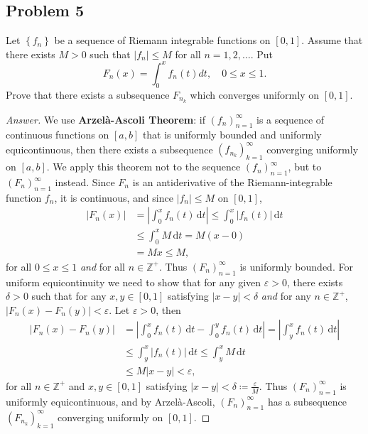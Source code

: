 \documentclass[12pt]{article}
\newcommand{\z}{\mathbb{Z}}
\newcommand{\ita}[1]{\textit{#1}}
\newcommand\paren[1]{\left( #1 \right)}
\newcommand\setb[1]{\left \{ #1 \right \}}
\newcommand{\abs}[1]{\left | #1 \right |}
\newcommand{\eps}{\varepsilon}
\renewcommand{\i}[4]{\int_{#1}^{#2} {#3} \, \mathrm{d} {#4} }
\theoremstyle{definition}
\begin{document}
\subsection{Problem 5 \texorpdfstring{\cite{Rudin}}{}}
Let $\setb{ f_n }$ be a sequence of Riemann integrable functions on $[0,1]$. Assume that there exists $M > 0$ such that $|f_n| \leq M$ for all $n = 1 , 2 , \dotsc$. Put
\[
    F_n(x) = \int_0^x f_n(t) dt, \quad 0 \leq x \leq 1.
\]
Prove that there exists a subsequence $F_{n_k}$ which converges uniformly on $[0,1]$.
\begin{proof}[Answer]
    We use \textbf{Arzel\`a-Ascoli Theorem}: if $\paren{ f_n }_{n = 1}^{\infty}$ is a sequence of continuous functions on $[a,b]$ that is uniformly bounded and uniformly equicontinuous, then there exists a subsequence $\paren{ f_{n_k} }_{k = 1}^{\infty}$ converging uniformly on $[a,b]$. We apply this theorem not to the sequence $\paren{ f_n }_{n=1}^{\infty}$, but to $\paren{ F_n }_{n = 1}^{\infty}$ instead. Since $F_n$ is an antiderivative of the Riemann-integrable function $f_n$, it is continuous, and since $\abs{ f_n } \leq M$ on $[0,1]$, 
    \begin{align*}
        \abs{ F_n(x) } & = \abs{ \i{0}{x}{f_n(t)}{t} } \leq \i{0}{x}{ \abs{ f_n(t) } }{t} \\ 
        & \leq \i{0}{x}{M}{t} = M(x - 0) \\ 
        & = Mx \leq M ,
    \end{align*}
    for all $0 \leq x \leq 1$ \ita{and} for all $n \in \z^+$. Thus $\paren{ F_n }_{n = 1}^{\infty}$ is uniformly bounded. For uniform equicontinuity we need to show that for any given $\eps > 0$, there exists $\delta > 0$ such that for any $x , y \in [0,1]$ satisfying $\abs{x - y} < \delta$ \ita{and} for any $n \in \z^+$, $\abs{ F_n(x) - F_n(y) } < \eps$. Let $\eps > 0$, then 
    \begin{align*}
        \abs{ F_n(x) - F_n(y) } & = \abs{ \i{0}{x}{f_n(t)}{t} - \i{0}{y}{f_n(t)}{t} } = \abs{ \i{y}{x}{f_n(t)}{t} } \\ 
        & \leq \i{y}{x}{\abs{f_n(t)}}{t} \leq \i{y}{x}{M}{t} \\ 
        & \leq M \abs{x - y} < \eps , 
    \end{align*}
    for all $n \in \z^+$ and $x,y \in [0,1]$ satisfying $\abs{x - y} < \delta \coloneqq \frac{\eps}{M}$. Thus $\paren{ F_n }_{n = 1}^{\infty}$ is uniformly equicontinuous, and by Arzel\`a-Ascoli, $\paren{ F_n }_{n = 1}^{\infty}$ has a subsequence $\paren{ F_{n_k} }_{k = 1}^{\infty}$ converging uniformly on $[0,1]$. 
\end{proof}
\end{document}
